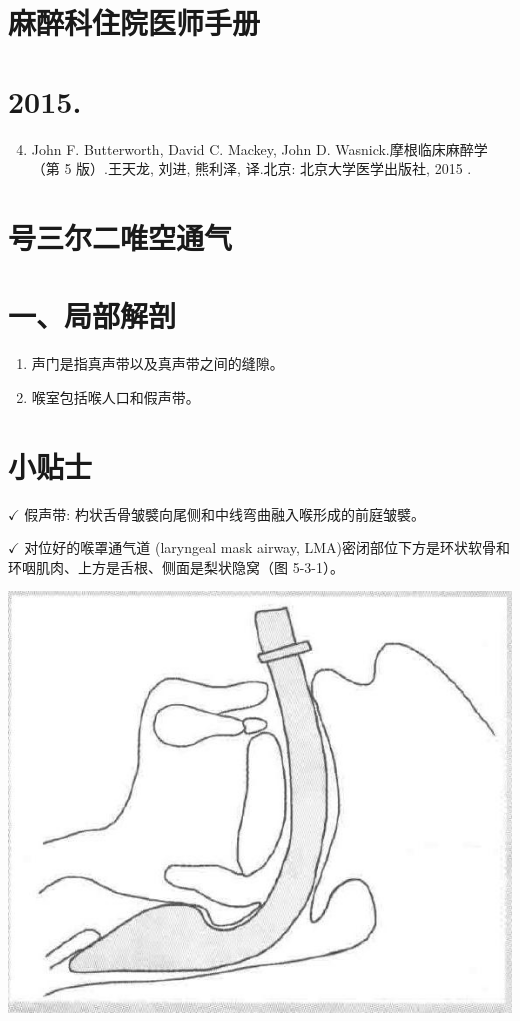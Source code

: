 \documentclass[10pt]{article}
\begin{document}
\section*{麻醉科住院医师手册}
\section*{2015.}
\begin{enumerate}
  \setcounter{enumi}{3}
  \item John F. Butterworth, David C. Mackey, John D. Wasnick.摩根临床麻醉学（第 5 版）.王天龙, 刘进, 熊利泽, 译.北京: 北京大学医学出版社, 2015 .
\end{enumerate}

\section*{号三尔二唯空通气}
\section*{一、局部解剖}
\begin{enumerate}
  \item 声门是指真声带以及真声带之间的缝隙。

  \item 喉室包括喉人口和假声带。

\end{enumerate}

\section*{小贴士}
$\checkmark$ 假声带: 杓状舌骨皱襞向尾侧和中线弯曲融入喉形成的前庭皱襞。

$\checkmark$ 对位好的喉罩通气道 (laryngeal mask airway, LMA)密闭部位下方是环状软骨和环咽肌肉、上方是舌根、侧面是梨状隐窝（图 5-3-1）。

\begin{center}
\includegraphics[max width=\textwidth]{2024_07_05_645bb794a4d4f32ee0c8g-292}
\end{center}
\end{document}
